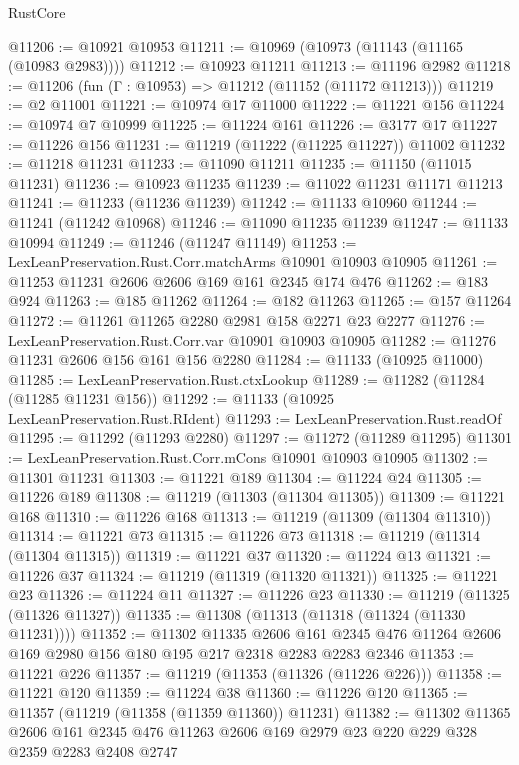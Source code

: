 \begin{lexlean}{RustCore}
\begin{coremodule}
@11206 := @10921 @10953
@11211 := @10969 (@10973 (@11143 (@11165 (@10983 @2983))))
@11212 := @10923 @11211
@11213 := @11196 @2982
@11218 := @11206 (fun (Γ : @10953) => @11212 (@11152 (@11172 @11213)))
@11219 := @2 @11001
@11221 := @10974 @17 @11000
@11222 := @11221 @156
@11224 := @10974 @7 @10999
@11225 := @11224 @161
@11226 := @3177 @17
@11227 := @11226 @156
@11231 := @11219 (@11222 (@11225 @11227)) @11002
@11232 := @11218 @11231
@11233 := @11090 @11211
@11235 := @11150 (@11015 @11231)
@11236 := @10923 @11235
@11239 := @11022 @11231 @11171 @11213
@11241 := @11233 (@11236 @11239)
@11242 := @11133 @10960
@11244 := @11241 (@11242 @10968)
@11246 := @11090 @11235 @11239
@11247 := @11133 @10994
@11249 := @11246 (@11247 @11149)
@11253 := LexLeanPreservation.Rust.Corr.matchArms @10901 @10903 @10905
@11261 := @11253 @11231 @2606 @2606 @169 @161 @2345 @174 @476
@11262 := @183 @924
@11263 := @185 @11262
@11264 := @182 @11263
@11265 := @157 @11264
@11272 := @11261 @11265 @2280 @2981 @158 @2271 @23 @2277
@11276 := LexLeanPreservation.Rust.Corr.var @10901 @10903 @10905
@11282 := @11276 @11231 @2606 @156 @161 @156 @2280
@11284 := @11133 (@10925 @11000)
@11285 := LexLeanPreservation.Rust.ctxLookup
@11289 := @11282 (@11284 (@11285 @11231 @156))
@11292 := @11133 (@10925 LexLeanPreservation.Rust.RIdent)
@11293 := LexLeanPreservation.Rust.readOf
@11295 := @11292 (@11293 @2280)
@11297 := @11272 (@11289 @11295)
@11301 := LexLeanPreservation.Rust.Corr.mCons @10901 @10903 @10905
@11302 := @11301 @11231
@11303 := @11221 @189
@11304 := @11224 @24
@11305 := @11226 @189
@11308 := @11219 (@11303 (@11304 @11305))
@11309 := @11221 @168
@11310 := @11226 @168
@11313 := @11219 (@11309 (@11304 @11310))
@11314 := @11221 @73
@11315 := @11226 @73
@11318 := @11219 (@11314 (@11304 @11315))
@11319 := @11221 @37
@11320 := @11224 @13
@11321 := @11226 @37
@11324 := @11219 (@11319 (@11320 @11321))
@11325 := @11221 @23
@11326 := @11224 @11
@11327 := @11226 @23
@11330 := @11219 (@11325 (@11326 @11327))
@11335 := @11308 (@11313 (@11318 (@11324 (@11330 @11231))))
@11352 := @11302
    @11335
    @2606
    @161
    @2345
    @476
    @11264
    @2606
    @169
    @2980
    @156
    @180
    @195
    @217
    @2318
    @2283
    @2283
    @2346
@11353 := @11221 @226
@11357 := @11219 (@11353 (@11326 (@11226 @226)))
@11358 := @11221 @120
@11359 := @11224 @38
@11360 := @11226 @120
@11365 := @11357 (@11219 (@11358 (@11359 @11360)) @11231)
@11382 := @11302
    @11365
    @2606
    @161
    @2345
    @476
    @11263
    @2606
    @169
    @2979
    @23
    @220
    @229
    @328
    @2359
    @2283
    @2408
    @2747

\end{coremodule}
\end{lexlean}
